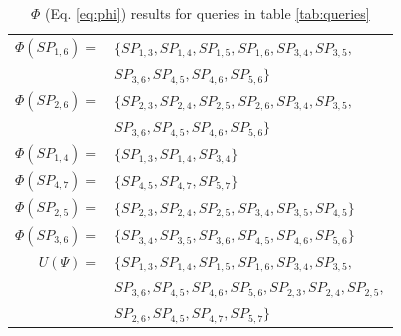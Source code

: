 \begin{table}
\begin{tabular}{r p{}}
$\Phi(SP_{1,6})=$ 	& $\{SP_{1,3},SP_{1,4},SP_{1,5},SP_{1,6},SP_{3,4},SP_{3,5},$\\
		 	& $SP_{3,6},SP_{4,5},SP_{4,6},SP_{5,6}\}$ \\
$\Phi(SP_{2,6})=$ 	& $\{SP_{2,3},SP_{2,4},SP_{2,5},SP_{2,6},SP_{3,4},SP_{3,5},$ \\
			& $SP_{3,6},SP_{4,5},SP_{4,6},SP_{5,6}\}$ \\
$\Phi(SP_{1,4})=$ 	& $\{SP_{1,3},SP_{1,4},SP_{3,4}\}$ \\
$\Phi(SP_{4,7})=$ 	& $\{SP_{4,5},SP_{4,7},SP_{5,7}\}$ \\
$\Phi(SP_{2,5})=$ 	& $\{SP_{2,3},SP_{2,4},SP_{2,5},SP_{3,4},SP_{3,5},SP_{4,5}\}$ \\
$\Phi(SP_{3,6})=$ 	& $\{SP_{3,4},SP_{3,5},SP_{3,6},SP_{4,5},SP_{4,6},SP_{5,6}\}$ \\\hline
$U(\Psi) =$ 		& $\{SP_{1,3},SP_{1,4},SP_{1,5},SP_{1,6},SP_{3,4},SP_{3,5},$ \\
			& $SP_{3,6},SP_{4,5},SP_{4,6},SP_{5,6},SP_{2,3},SP_{2,4},SP_{2,5},$ \\
			& $SP_{2,6},SP_{4,5},SP_{4,7},SP_{5,7}\}$  \\
\end{tabular}
\caption{$\Phi$ (Eq. \ref{eq:phi}) results for queries in table \ref{tab:queries}}
\label{tab:chi}
\end{table}




